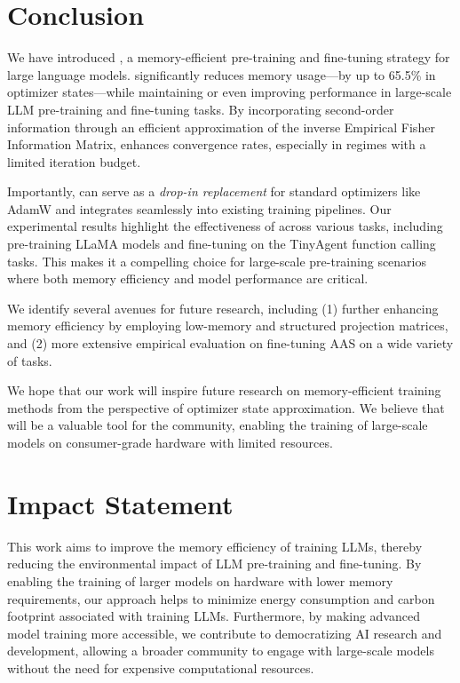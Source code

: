 \section{Conclusion}

We have introduced \textit{\lowrank}, a memory-efficient pre-training and fine-tuning strategy for large language models. \textit{\lowrank} significantly reduces memory usage—by up to 65.5\% in optimizer states—while maintaining or even improving performance in large-scale LLM pre-training and fine-tuning tasks. By incorporating second-order information through an efficient approximation of the inverse Empirical Fisher Information Matrix, \textit{\lowrank} enhances convergence rates, especially in regimes with a limited iteration budget.

Importantly, \textit{\lowrank} can serve as a \emph{drop-in replacement} for standard optimizers like AdamW and integrates seamlessly into existing training pipelines. Our experimental results highlight the effectiveness of \textit{\lowrank} across various tasks, including pre-training LLaMA models and fine-tuning on the TinyAgent function calling tasks. This makes it a compelling choice for large-scale pre-training scenarios where both memory efficiency and model performance are critical.

We identify several avenues for future research, including (1) further enhancing memory efficiency by employing low-memory and structured projection matrices, and (2) more extensive empirical evaluation on fine-tuning AAS on a wide variety of tasks.

We hope that our work will inspire future research on memory-efficient training methods from the perspective of optimizer state approximation. We believe that \textit{\lowrank} will be a valuable tool for the community, enabling the training of large-scale models on consumer-grade hardware with limited resources.

\section*{Impact Statement}

This work aims to improve the memory efficiency of training LLMs, thereby reducing the environmental impact of LLM pre-training and fine-tuning. By enabling the training of larger models on hardware with lower memory requirements, our approach helps to minimize energy consumption and carbon footprint associated with training LLMs. Furthermore, by making advanced model training more accessible, we contribute to democratizing AI research and development, allowing a broader community to engage with large-scale models without the need for expensive computational resources.
